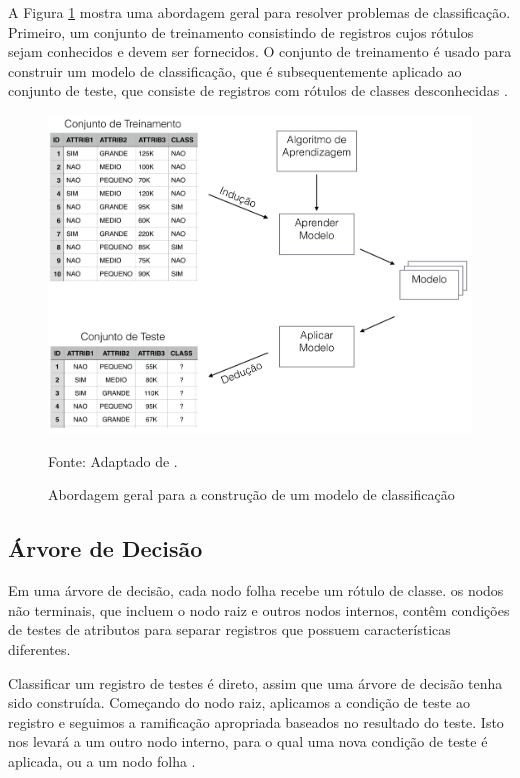 \documentclass[
	12pt,				%
	openright,			%
	oneside,	
	a4paper,				%
	english,				%
	brazil				%
]{abntex2/abntex2} %
\begin{document}
	A Figura \ref{figabordagemModeloClassificacao} mostra uma abordagem geral para resolver problemas de classificação. Primeiro, um conjunto de treinamento consistindo de registros cujos rótulos sejam conhecidos e devem ser fornecidos. O conjunto de treinamento é usado para construir um modelo de classificação, que é subsequentemente aplicado ao conjunto de teste, que consiste de registros com rótulos de classes desconhecidas \cite{tan:2009}.
	\\
	\begin{figure}[!htb]
		\caption{\label{figabordagemModeloClassificacao} Abordagem geral para a construção de um modelo de classificação }
		\begin{center}
			\includegraphics[scale=0.3]{img/abordagemModeloClassificacao.png}
		\end{center}
		Fonte: Adaptado de \cite{tan:2009}.
	\end{figure}

	\subsection{Árvore de Decisão}
	
		Em uma árvore de decisão, cada nodo folha recebe um rótulo de classe. os nodos não terminais, que incluem o nodo raiz e outros nodos internos, contêm condições de testes de atributos para separar registros que possuem características diferentes.
		
		Classificar um registro de testes é direto, assim que uma árvore de decisão tenha sido construída. Começando do nodo raiz, aplicamos a condição de teste ao registro e seguimos a ramificação apropriada baseados no resultado do teste. Isto nos levará a um outro nodo interno, para o qual uma nova condição de teste é aplicada, ou a um nodo folha \cite{tan:2009}.
	
\end{document}
